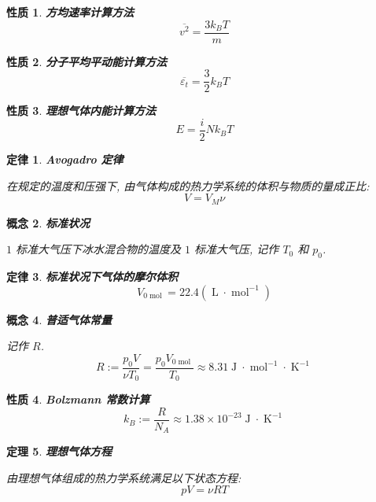\documentclass[UTF8]{ctexart}
\newcommand{\<}{\langle}
\renewcommand{\>}{\rangle}                              %
\newenvironment{dfn_box}{
    \begin{tcolorbox}[enhanced, colback=dfn_green2, boxrule=0pt, frame hidden,
        borderline west={0.7mm}{0.1mm}{dfn_green1},breakable]
    }
    {\end{tcolorbox}}
\newenvironment{axm_box}{
    \begin{tcolorbox}[enhanced, colback=axm_yellow2, boxrule=0pt, frame hidden,
        borderline west={0.7mm}{0.1mm}{axm_yellow1},breakable]
    }
    {\end{tcolorbox}}
\newenvironment{thm_box}{
    \begin{tcolorbox}[enhanced, colback=thm_blue2, boxrule=0pt, frame hidden,
        borderline west={0.7mm}{0.1mm}{thm_blue1},breakable]
    }
    {\end{tcolorbox}}
\newenvironment{ppt_box}{
    \begin{tcolorbox}[enhanced, colback=ppt_pink2, boxrule=0pt, frame hidden,
        borderline west={0.7mm}{0.1mm}{ppt_pink1},breakable]
    }
    {\end{tcolorbox}}
\theoremstyle{MyStyle} %
\newtheorem{definition}{概念}[subsection]
\newenvironment{cpt}{\begin{dfn_box}\begin{definition}}{\end{definition}\end{dfn_box}}
\newtheorem{axm}[definition]{定律}
\newenvironment{thr}{\begin{axm_box}\begin{axm}}{\end{axm}\end{axm_box}}
\newtheorem{theorem}[definition]{定理}
\newenvironment{thm}{\begin{thm_box}\begin{theorem}}{\end{theorem}\end{thm_box}}
\newtheorem{property}{性质}[definition]
\newenvironment{ppt}{\begin{ppt_box}\begin{property}}{\end{property}\end{ppt_box}}
\DeclareMathOperator{\J}{\mathrm{J}}
\DeclareMathOperator{\mol}{\mathrm{mol}}
\DeclareMathOperator{\Ltr}{\mathrm{L}}
\DeclareMathOperator{\Kv}{\mathrm{K}}
\begin{document}
        \begin{ppt}
            \textbf{方均速率计算方法}
            \[\overline{v^2}=\frac{3k_B T}{m}\]
        \end{ppt}

        \begin{ppt}
            \textbf{分子平均平动能计算方法}
            \[\overline{\varepsilon_t}=\frac{3}{2}k_B T\]
        \end{ppt}
        
        \begin{ppt}
            \textbf{理想气体内能计算方法}
            \[E=\frac{i}{2}N k_B T\]
        \end{ppt}
        
        \begin{thr}
            \textbf{Avogadro 定律}
            
            在规定的温度和压强下, 由气体构成的热力学系统的体积与物质的量成正比: 
            \[V=V_M\nu\]
        \end{thr}
        
        \begin{cpt}
            \textbf{标准状况}
            
            \(1\) 标准大气压下冰水混合物的温度及 \(1\) 标准大气压, 记作 \(T_0\) 和 \(p_0\). 
        \end{cpt}
        
        \begin{thr}
            \textbf{标准状况下气体的摩尔体积}
            \[V_{0\mol}=22.4(\Ltr\cdot\mol^{-1})\]
        \end{thr}
        
        \begin{cpt}
            \textbf{普适气体常量}

            记作 \(R\). 
            \[R:=\frac{p_0 V}{\nu T_0}=\frac{p_0 V_{0\mol}}{T_0}\approx 8.31\J\cdot\mol^{-1}\cdot\Kv^{-1}\]
        \end{cpt}
        
        \begin{ppt}
            \textbf{Bolzmann 常数计算}
            \[k_B:=\frac{R}{N_A}\approx 1.38\times 10^{-23}\J\cdot\Kv^{-1}\]
        \end{ppt}
        
        \begin{thm}
            \textbf{理想气体方程}

            由理想气体组成的热力学系统满足以下状态方程: 
            \[pV=\nu RT\]
        \end{thm}
\end{document}
